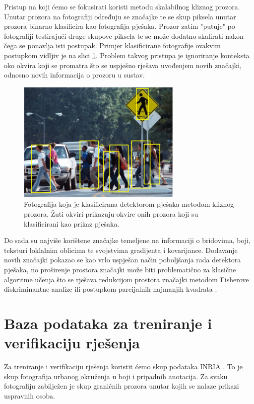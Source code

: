 \documentclass[seminar]{fer}
\begin{document}
Pristup na koji ćemo se fokusirati koristi metodu skalabilnog kliznog prozora. Unutar prozora na fotografiji određuju se značajke te se skup piksela unutar prozora binarno klasificira kao fotografija pješaka. Prozor zatim "putuje" po fotografiji testirajući druge skupove piksela te se može dodatno skalirati nakon čega se ponavlja isti postupak. Primjer klasificirane fotografije ovakvim postupkom vidljiv je na slici \ref{primjer_klasifikacije}. Problem takvog pristupa je ignoriranje konteksta oko okvira koji se promatra što se uspješno rješava uvođenjem novih značajki, odnosno novih informacija o prozoru u sustav.
\begin{figure}
\center
\includegraphics[scale=0.7]{img/crossing.png}
\caption{Fotografija koja je klasificirana detektorom pješaka metodom kliznog prozora. Žuti okviri prikazuju okvire onih prozora koji su klasificirani kao prikaz pješaka.}
\label{primjer_klasifikacije}
\end{figure}

Do sada su najviše korištene značajke temeljene na informaciji o bridovima, boji, teksturi loklalnim oblicima te svojstvima gradijenta i kovarijance. Dodavanje novih značajki pokazao se kao vrlo uspješan način poboljšanja rada detektora pješaka, no proširenje prostora značajki može biti problematično za klasične algoritme učenja što se rješava redukcijom prostora značajki metodom Fisherove diskriminantne analize ili postupkom parcijalnih najmanjih kvadrata  \cite{Schwartz_humandetection}. 

\chapter{Baza podataka za treniranje i verifikaciju rješenja}

Za treniranje i verifikaciju rješenja koristit ćemo skup podataka INRIA \cite{DT05}. To je skup fotografija urbanog okruženja u boji i pripadnih anotacija. Za svaku fotografiju zabilježen je skup graničnih prozora  unutar kojih se nalaze prikazi uspravnih osoba.
\end{document}

